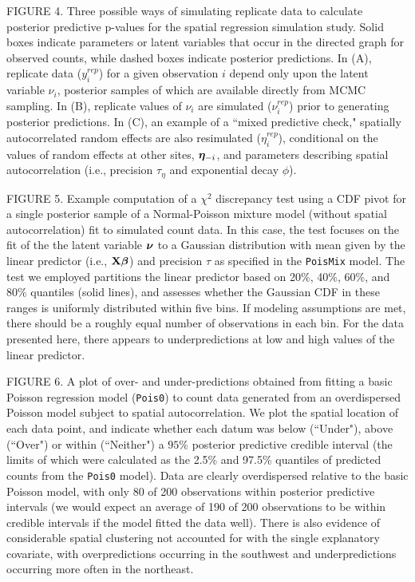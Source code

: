 \documentclass[12pt,english]{article}
\begin{document}
\begin{spacing}{1.9}
FIGURE 4.  Three possible ways of simulating replicate data to
calculate posterior predictive p-values for the spatial regression
simulation study. Solid boxes indicate parameters or latent variables
that occur in the directed graph for observed counts, while dashed
boxes indicate posterior predictions.  In (A), replicate data
($y_i^{rep}$) for a given observation $i$ depend only upon the latent
variable $\nu_i$, posterior samples of which are available directly
from MCMC sampling.  In (B), replicate values of $\nu_i$ are simulated
($\nu_i^{rep}$) prior to generating posterior predictions.  In (C), an
example of a ``mixed predictive check," spatially autocorrelated
random effects are also resimulated ($\eta_i^{rep}$), conditional on
the values of random effects at other sites, $\boldsymbol{\eta}_{-i}$, and
parameters describing spatial autocorrelation (i.e., precision
$\tau_\eta$ and exponential decay $\phi$).

FIGURE 5.  Example computation of a $\chi^2$ discrepancy test using a
CDF pivot for a single posterior sample of a Normal-Poisson mixture
model (without spatial autocorrelation) fit to simulated count data.
In this case, the test focuses on the fit of the the latent variable
$\boldsymbol{\nu}$ to a Gaussian distribution with mean given by the linear
predictor (i.e., ${\bf X}\boldsymbol{\beta}$) and precision $\tau$ as specified in
the \texttt{PoisMix} model. The test we employed partitions the linear
predictor based on 20\%, 40\%, 60\%, and 80\% quantiles (solid lines),
and assesses whether the Gaussian CDF in these ranges is uniformly
distributed within five bins.  If modeling assumptions are met, there
should be a roughly equal number of observations in each bin.  For the
data presented here, there appears to underpredictions at low and high
values of the linear predictor.

FIGURE 6. A plot of over- and under-predictions obtained from fitting a basic Poisson
regression model (\texttt{Pois0}) to count data generated from an overdispersed Poisson model subject to
spatial autocorrelation.  We plot the spatial location of each data point, and indicate
whether each datum was below (``Under"), above (``Over") or within (``Neither") a $95\%$ posterior
predictive credible interval (the limits of which were calculated as the 2.5\% and 97.5\% quantiles of predicted counts
from the \texttt{Pois0} model).  Data are clearly overdispersed relative to the basic Poisson model, with only 80 of 200 observations
within posterior predictive intervals (we would expect an average of 190 of 200 observations to be within credible intervals if the model
fitted the data well).  There is also evidence of considerable spatial clustering not accounted for with the
single explanatory covariate, with overpredictions occurring in the southwest and underpredictions occurring more often in the northeast.    


\end{spacing}
\end{document}
